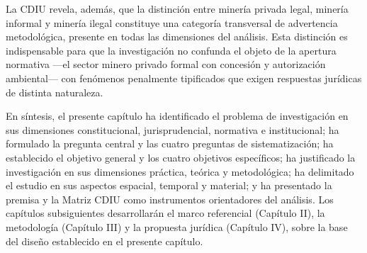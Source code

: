 La CDIU revela, además, que la distinción entre minería privada legal, minería informal y minería ilegal constituye una categoría transversal de advertencia metodológica, presente en todas las dimensiones del análisis. Esta distinción es indispensable para que la investigación no confunda el objeto de la apertura normativa ---el sector minero privado formal con concesión y autorización ambiental--- con fenómenos penalmente tipificados que exigen respuestas jurídicas de distinta naturaleza.

\bigskip

En síntesis, el presente capítulo ha identificado el problema de investigación en sus dimensiones constitucional, jurisprudencial, normativa e institucional; ha formulado la pregunta central y las cuatro preguntas de sistematización; ha establecido el objetivo general y los cuatro objetivos específicos; ha justificado la investigación en sus dimensiones práctica, teórica y metodológica; ha delimitado el estudio en sus aspectos espacial, temporal y material; y ha presentado la premisa y la Matriz CDIU como instrumentos orientadores del análisis. Los capítulos subsiguientes desarrollarán el marco referencial (Capítulo II), la metodología (Capítulo III) y la propuesta jurídica (Capítulo IV), sobre la base del diseño establecido en el presente capítulo.

\nocite{ley_mineria_2009}
\nocite{ley_mineria_2025}
\nocite{cedec_guia_2023}
\nocite{medina_garcia_2026}
\nocite{acuerdo_escazu_2018}
\nocite{cepal_ruta_escazu_2023}
\nocite{coip_2014}
\nocite{reglamento_general_ley_mineria_2009}
\nocite{pillajo_2024}

